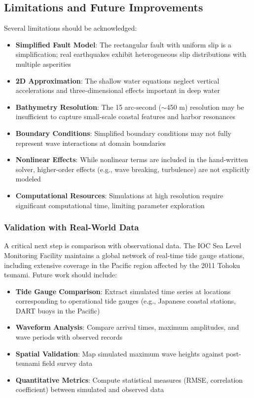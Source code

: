 \documentclass[12pt]{article}
\begin{document}
\subsection{Limitations and Future Improvements}

Several limitations should be acknowledged:

\begin{itemize}
    \item \textbf{Simplified Fault Model}: The rectangular fault with uniform slip is a simplification; real earthquakes exhibit heterogeneous slip distributions with multiple asperities
    \item \textbf{2D Approximation}: The shallow water equations neglect vertical accelerations and three-dimensional effects important in deep water
    \item \textbf{Bathymetry Resolution}: The 15 arc-second ($\sim$450 m) resolution may be insufficient to capture small-scale coastal features and harbor resonances
    \item \textbf{Boundary Conditions}: Simplified boundary conditions may not fully represent wave interactions at domain boundaries
    \item \textbf{Nonlinear Effects}: While nonlinear terms are included in the hand-written solver, higher-order effects (e.g., wave breaking, turbulence) are not explicitly modeled
    \item \textbf{Computational Resources}: Simulations at high resolution require significant computational time, limiting parameter exploration
\end{itemize}

\subsubsection{Validation with Real-World Data}

A critical next step is comparison with observational data. The IOC Sea Level Monitoring Facility \cite{ioc_sealevel} maintains a global network of real-time tide gauge stations, including extensive coverage in the Pacific region affected by the 2011 Tohoku tsunami. Future work should include:

\begin{itemize}
    \item \textbf{Tide Gauge Comparison}: Extract simulated time series at locations corresponding to operational tide gauges (e.g., Japanese coastal stations, DART buoys in the Pacific)
    \item \textbf{Waveform Analysis}: Compare arrival times, maximum amplitudes, and wave periods with observed records
    \item \textbf{Spatial Validation}: Map simulated maximum wave heights against post-tsunami field survey data
    \item \textbf{Quantitative Metrics}: Compute statistical measures (RMSE, correlation coefficient) between simulated and observed data
\end{itemize}
\end{document}
